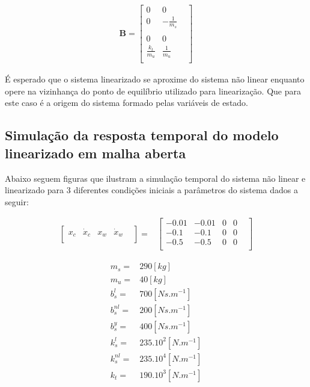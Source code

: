 \documentclass[a4paper]{ifacconf}
\begin{document}
    \begin{equation} 
    \begin{split}
        \mathbf{B} = 
        \begin{bmatrix}
            0 & 0 & \\
            0 & -\frac{1}{m_s}&\\ \\
            0 & 0 & \\
            \frac{k_t}{m_u}&\frac{1}{m_u} \\
        \end{bmatrix}
    \end{split}
    \end{equation}
    
    É esperado que o  sistema linearizado se aproxime do sistema não linear enquanto opere na vizinhança do ponto de equilíbrio utilizado para linearização. Que para este caso é a origem do sistema formado pelas variáveis de estado.
    \subsection{Simulação da resposta temporal do modelo linearizado em malha aberta}
    Abaixo seguem figuras que ilustram a simulação temporal do sistema não linear e linearizado para 3 diferentes condições iniciais a parâmetros do sistema dados a seguir: 
    
    \begin{equation*} 
    \begin{split}
        \begin{bmatrix}
            x_c & \dot{x}_c & x_w & \dot{x}_w & \\
        \end{bmatrix}=
    \end{split}
    \begin{split}
        \begin{bmatrix}
            -0.01& -0.01& 0& 0& \\
             -0.1&  -0.1& 0& 0& \\
             -0.5&  -0.5& 0& 0&\\
        \end{bmatrix}
    \end{split}
    \end{equation*}
    
   \begin{equation} \label{eq:parametros}
        \begin{split} 
        m_s =   & 290     [kg]\\
        m_u =   & 40      [kg]\\
        b^{l}_s =  & 700  [Ns.m^{-1}]\\
        b^{nl}_s =  & 200      [Ns.m^{-1}]\\
        b^{y}_s=  & 400      [Ns.m^{-1}]\\
        k^{l}_s =  & 235.10^2 [N.m^{-1}]\\
        k^{nl}_s = & 235.10^4 [N.m^{-1}]\\
        k_t =  & 190.10^3 [N.m^{-1}]\\
        \end{split}
    \end{equation}
\end{document}
